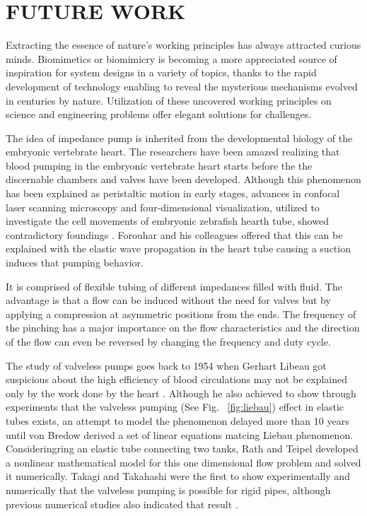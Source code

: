 \chapter{FUTURE WORK}\label{ch:ch7}

Extracting the essence of nature's working principles has always attracted curious minds. Biomimetics or biomimicry is becoming a more appreciated source of inspiration for system designs in a variety of topics, thanks to the rapid development of technology enabling to reveal the mysterious mechanisms evolved in centuries by nature. Utilization of these uncovered working principles on science and engineering problems offer elegant solutions for challenges. 

The idea of impedance pump is inherited from the developmental biology of the embryonic vertebrate heart. The researchers have been amazed realizing that blood pumping in the embryonic vertebrate heart starts before the the discernable chambers and valves have been developed. Although this phenomenon has been explained as peristaltic motion in early stages, advances in confocal laser scanning microscopy and four-dimensional visualization, utilized to investigate the cell movements of embryonic zebrafish hearth tube, showed contradictory foundings \cite{forouhar2006embryonic}. Forouhar and his colleagues offered that this can be explained with the elastic wave propagation in the heart tube causing a suction induces that pumping behavior. 

It is comprised of flexible tubing of different impedances filled with fluid. The advantage is that a flow can be induced without the need for valves but by applying a compression at asymmetric positions from the ends. The frequency of the pinching has a major importance on the flow characteristics and the direction of the flow can even be reversed by changing the frequency and duty cycle. 

The study of valveless pumps goes back to 1954 when Gerhart Libeau got suspicious about the high efficiency of blood circulations may not be explained only by the work done by the heart \cite{LiebauStartedThis,Liebau2,Liebau3}. 
 Although he also achieved to show through experiments that the valveless pumping (See Fig. ~\ref{fig:liebau}) effect in elastic tubes exists, an attempt to model the phenomenon  delayed more than 10 years until von Bredow \cite{firstCompWork} derived a set of linear equations matcing Liebau phenomenon. Consideringring an elastic tube connecting two tanks, Rath and Teipel \cite{CompWorkRathTeipel} developed a nonlinear mathematical model for this one dimensional flow problem and solved it numerically. Takagi and Takahashi \cite{rigidPipesTakagi} were the first to show experimentally and numerically that the valveless pumping is possible for rigid pipes, although previous numerical studies also indicated that result \cite{numInvLiebauPhenom}.
 
